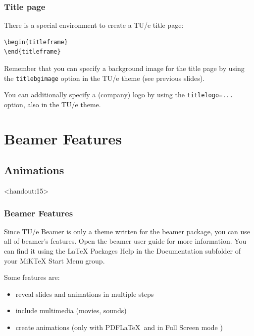\documentclass[t]{beamer}
\begin{document}
\begin{frame}[fragile]
\frametitle{Title page}

There is a special environment to create a TU/e title page:

\begin{lstlisting}
\begin{titleframe}
\end{titleframe}
\end{lstlisting}

Remember that you can specify a background image for the title page by using the
{\tt titlebgimage} option in the TU/e theme (see previous slides).

You can additionally specify a (company) logo by using the {\tt titlelogo=...} option, also in the TU/e theme.

\end{frame}
\newlength{\vsp}
\section{Beamer Features}
\subsection{Animations}
\begin{frame}<handout:15>  %

\frametitle{Beamer Features}

Since TU/e Beamer is only a theme written for the {\sf beamer} package, you can use all of {\sf beamer}'s features. Open the beamer user guide for more information. You can find it using the LaTeX Packages Help in the Documentation subfolder of your MiKTeX Start Menu group.

\bigskip
Some features are:
\begin{itemize}
\pause\item reveal slides and animations in multiple steps
\pause\item include multimedia (movies, sounds)
\pause\item\hspace{\vsp}create animations (only with PDF\LaTeX\ and in Full Screen mode )
\end{itemize}
\end{frame}
\end{document}
